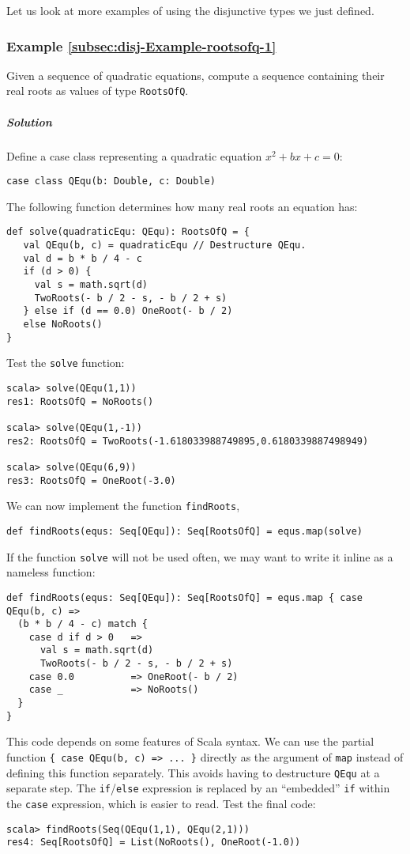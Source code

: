 Let us look at more examples of using the disjunctive types we just
defined.

\subsubsection{Example \label{subsec:disj-Example-rootsofq-1}\ref{subsec:disj-Example-rootsofq-1}}

Given a sequence of quadratic equations, compute a sequence containing
their real roots as values of type \lstinline!RootsOfQ!.

\subparagraph{Solution}

Define a case class representing a quadratic equation $x^{2}+bx+c=0$:
\begin{lstlisting}
case class QEqu(b: Double, c: Double)
\end{lstlisting}
The following function determines how many real roots an equation
has:
\begin{lstlisting}
def solve(quadraticEqu: QEqu): RootsOfQ = {
   val QEqu(b, c) = quadraticEqu // Destructure QEqu.
   val d = b * b / 4 - c
   if (d > 0) {
     val s = math.sqrt(d)
     TwoRoots(- b / 2 - s, - b / 2 + s)
   } else if (d == 0.0) OneRoot(- b / 2)
   else NoRoots()
}
\end{lstlisting}
Test the \lstinline!solve! function:
\begin{lstlisting}
scala> solve(QEqu(1,1))
res1: RootsOfQ = NoRoots()

scala> solve(QEqu(1,-1))
res2: RootsOfQ = TwoRoots(-1.618033988749895,0.6180339887498949) 

scala> solve(QEqu(6,9))
res3: RootsOfQ = OneRoot(-3.0) 
\end{lstlisting}
We can now implement the function \lstinline!findRoots!,
\begin{lstlisting}
def findRoots(equs: Seq[QEqu]): Seq[RootsOfQ] = equs.map(solve)
\end{lstlisting}
If the function \lstinline!solve! will not be used often, we may
want to write it inline as a nameless function:
\begin{lstlisting}
def findRoots(equs: Seq[QEqu]): Seq[RootsOfQ] = equs.map { case QEqu(b, c) =>
  (b * b / 4 - c) match {
    case d if d > 0   =>
      val s = math.sqrt(d)
      TwoRoots(- b / 2 - s, - b / 2 + s)
    case 0.0          => OneRoot(- b / 2)
    case _            => NoRoots()
  }
}
\end{lstlisting}
This code depends on some features of Scala syntax. We can use the
partial function \lstinline!{ case QEqu(b, c) => ... }! directly
as the argument of \lstinline!map! instead of defining this function
separately. This avoids having to destructure \lstinline!QEqu! at
a separate step. The \lstinline!if!/\lstinline!else! expression
is replaced by an ``embedded''
\lstinline!if! within the \lstinline!case! expression, which is
easier to read. Test the final code:
\begin{lstlisting}
scala> findRoots(Seq(QEqu(1,1), QEqu(2,1)))
res4: Seq[RootsOfQ] = List(NoRoots(), OneRoot(-1.0)) 
\end{lstlisting}


